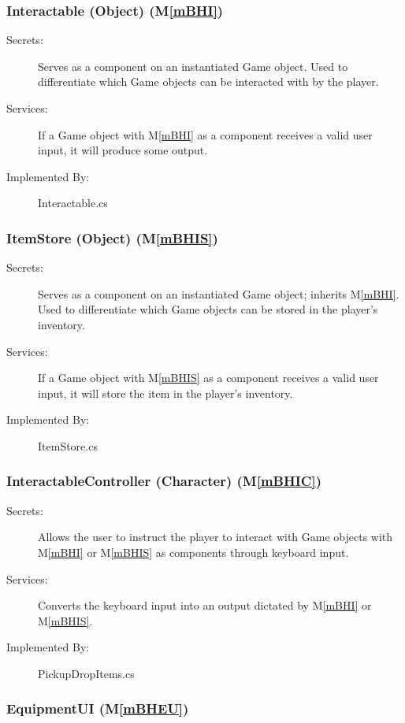 \documentclass[12pt, titlepage]{article}
\newcommand{\mref}[1]{M\ref{#1}}
\begin{document}
\subsubsection{Interactable (Object) (\mref{mBHI})}

\begin{description}
\item[Secrets:] Serves as a component on an instantiated Game object. Used to differentiate which Game objects can be interacted with by the player.
\item[Services:] If a Game object with \mref{mBHI} as a component receives a valid user input, it will produce some output. 
\item[Implemented By:] Interactable.cs
\end{description}

\subsubsection{ItemStore (Object) (\mref{mBHIS})}

\begin{description}
\item[Secrets:] Serves as a component on an instantiated Game object; inherits \mref{mBHI}. Used to differentiate which Game objects can be stored in the player's inventory.
\item[Services:] If a Game object with \mref{mBHIS} as a component receives a valid user input, it will store the item in the player's inventory.
\item[Implemented By:] ItemStore.cs
\end{description}

\subsubsection{InteractableController (Character)  (\mref{mBHIC})}

\begin{description}
\item[Secrets:] Allows the user to instruct the player to interact with Game objects with \mref{mBHI} or \mref{mBHIS} as components through keyboard input.
\item[Services:] Converts the keyboard input into an output dictated by \mref{mBHI} or \mref{mBHIS}.
\item[Implemented By:] PickupDropItems.cs
\end{description}

\subsubsection{EquipmentUI (\mref{mBHEU})}
\end{document}
